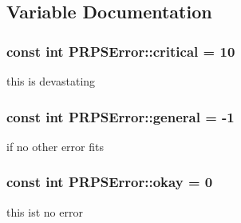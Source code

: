 \subsection{\-Variable \-Documentation}
\hypertarget{namespace_p_r_p_s_error_addc545a6b9d0f209f59d90b898a2e790}{
\subsubsection[{critical}]{\setlength{\rightskip}{0pt plus 5cm}const int {\bf \-P\-R\-P\-S\-Error\-::critical} = 10}}\label{namespace_p_r_p_s_error_addc545a6b9d0f209f59d90b898a2e790}
this is devastating \hypertarget{namespace_p_r_p_s_error_ac3c2f69daed93e3a7674df731358b01a}{
\subsubsection[{general}]{\setlength{\rightskip}{0pt plus 5cm}const int {\bf \-P\-R\-P\-S\-Error\-::general} = -\/1}}\label{namespace_p_r_p_s_error_ac3c2f69daed93e3a7674df731358b01a}
if no other error fits \hypertarget{namespace_p_r_p_s_error_a504d9167db089a807cc91bd217b6c976}{
\subsubsection[{okay}]{\setlength{\rightskip}{0pt plus 5cm}const int {\bf \-P\-R\-P\-S\-Error\-::okay} = 0}}\label{namespace_p_r_p_s_error_a504d9167db089a807cc91bd217b6c976}
this ist no error 